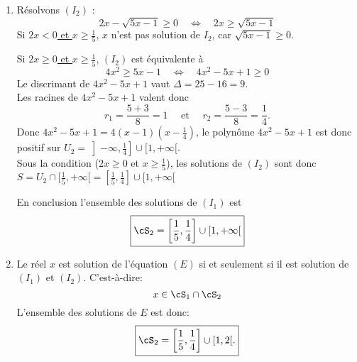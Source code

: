 \begin{correction}
\begin{enumerate}
En conclusion l'ensemble des solutions de $(I_1)$ est 
$$\boxed{ 
\cS_1 = \Big[\frac{1}{5}, \frac{1}{2}\Big[\cup  \Big[\frac{1}{2}, 2\Big[ = \Big[\frac{1}{5}, 2\Big[.$$
}$$



\item  Résolvons $(I_2)$ : 
\begin{equation*}
2x -\sqrt{5x-1}\geq 0\quad \Longleftrightarrow \quad  2x\geq  \sqrt{5x-1} 
\end{equation*}
Si \underline{$2x<0$ et $x\geq \frac{1}{5}$}, $x$ n'est pas solution de $I_2$, car $ \sqrt{5x-1} \geq 0$. 


Si \underline{$2x\geq 0$ et $x\geq \frac{1}{5}$}, $(I_2)$ est équivalente à 
$$4x^2 \geq  5x-1 \quad \Longleftrightarrow \quad  4x^2-5x+1\geq  0 $$ 
Le discrimant de $4x^2-5x+1$ vaut $\Delta= 25 -16= 9$. \\
 Les racines de $4x^2-5x+1$ valent donc 
$$r_1 = \frac{5+3}{8}=1 \quad \text{ et } \quad r_2= \frac{5-3}{8}=\frac{1}{4}.$$
Donc $4x^2-5x+1 = 4(x-1)(x-\frac{1}{4})$, le polynôme $4x^2-5x+1 $ est donc positif  sur $ U_2 =\left]-\infty, \frac{1}{4}\right]\cup[1, +\infty[. $\\
Sous la condition ($2x\geq 0$ et $x\geq \frac{1}{5}$), les solutions de $(I_2)$ sont donc 
$S=U_2\cap [\frac{1}{5},+\infty[= \left[\frac{1}{5}, \frac{1}{4}\right] \cup [1, +\infty [ $

En conclusion l'ensemble des solutions de $(I_1)$ est 
$$\boxed{ 
\cS_2 = \left[\frac{1}{5}, \frac{1}{4}\right] \cup [1, +\infty [ 
}$$
\item Le réel $x$ est solution de l'équation $(E)$ si et seulement si il est solution de $(I_1)$ et $(I_2)$. C'est-à-dire: 
$$x\in \cS_1\cap \cS_2$$
L'ensemble des solutions de $E$ est donc:
$$\boxed{ 
\cS_2 = \left[\frac{1}{5}, \frac{1}{4}\right] \cup [1,2[.
}$$




\end{enumerate}
\end{correction}